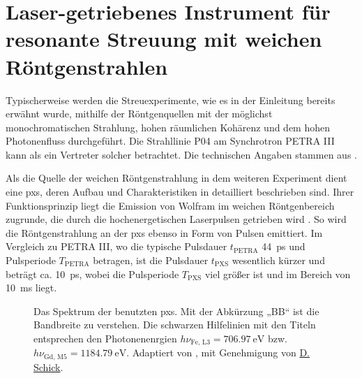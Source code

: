 \chapter{Laser-getriebenes Instrument für resonante Streuung mit weichen Röntgenstrahlen}
\label{text:quelle_roentgen}
Typischerweise werden die Streuexperimente, wie es in der Einleitung bereits erwähnt wurde, mithilfe der Röntgenquellen mit der möglichst monochromatischen Strahlung, hohen räumlichen Kohärenz und dem hohen Photonenfluss durchgeführt. Die Strahllinie P04 am Synchrotron PETRA III kann als ein Vertreter solcher betrachtet. Die technischen Angaben stammen aus \cite{viefhaus_variable_2013}.

\noindent
Als die Quelle der weichen Röntgenstrahlung in dem weiteren Experiment dient eine \gls{pxs}, deren Aufbau und Charakteristiken in \cite{schick_laser-driven_2021} detailliert beschrieben sind. Ihrer Funktionsprinzip liegt die Emission von Wolfram im weichen Röntgenbereich zugrunde, die durch die hochenergetischen Laserpulsen getrieben wird \cite{mantouvalou_high_2015}. So wird die Röntgenstrahlung an der \gls{pxs} ebenso in Form von Pulsen emittiert. Im Vergleich zu PETRA III, wo die typische Pulsdauer $t_\text{PETRA}$ \SI{44}{\pico\second} und Pulsperiode $T_\text{PETRA}$ betragen, ist die Pulsdauer $t_\text{PXS}$ wesentlich kürzer und beträgt ca. \SI{10}{\pico\second}, wobei die Pulsperiode $T_\text{PXS}$ viel größer ist und im Bereich von \SI{10}{\milli\second} liegt.
\begin{figure}[H]
    \centering
    
    \caption{Das Spektrum der benutzten \gls{pxs}. Mit der Abkürzung „BB“ ist die Bandbreite zu verstehen. Die schwarzen Hilfelinien mit den Titeln entsprechen den Photonenenrgien $h\nu_{\text{Fe, L3}} = \SI{706.97}{\eV}$ bzw. $h\nu_{\text{Gd, M5}} = \SI{1184,79}{\eV}$. Adaptiert von \cite{schick_laser-driven_2021}, mit Genehmigung von \href{https://orcid.org/0000-0001-7988-6489}{D. Schick}.}
    \label{fig:pxs_spectrum}
\end{figure}

